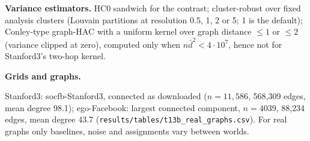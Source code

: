 \textbf{Variance estimators.} HC0 sandwich for the contrast; cluster-robust over fixed analysis clusters (Louvain partitions at resolution 0.5, 1, 2 or 5; 1 is the default); Conley-type graph-HAC with a uniform kernel over graph distance $\le1$ or $\le2$ (variance clipped at zero), computed only when $n\bar d^{2}<4\cdot10^{7}$, hence not for Stanford3's two-hop kernel.

\textbf{Grids and graphs.}
\begin{table}[h]
\caption{Grids: number of cells and replicates per cell (\texttt{results/tables/t13\_grid\_spec.csv}). $^\dagger$Designed after the first results were read (Appendix~\ref{app:post2}).}
\label{tab:grids}
\centering\scriptsize\setlength\tabcolsep{3pt}

\end{table}
\begin{table}[h]
\caption{Difference in means, OLS$(z,f)$ and the correctly specified regression by graph (concave spillover, $\gamma=2$, Bernoulli(0.5); \texttt{results/summary/e2.csv}).}
\label{tab:graphs}
\centering\scriptsize\setlength\tabcolsep{3pt}

\end{table}
Stanford3: socfb-Stanford3, connected as downloaded ($n=11{,}586$, 568{,}309 edges, mean degree 98.1); ego-Facebook: largest connected component, $n=4039$, 88{,}234 edges, mean degree 43.7 (\texttt{results/tables/t13b\_real\_graphs.csv}). For real graphs only baselines, noise and assignments vary between worlds.

\begin{table}[h]
\caption{Closed form (\ref{eq:bias}) versus simulation, 144 noiseless cells; \texttt{results/summary/theory\_vs\_sim\_e9.csv}.}
\label{tab:theory}
\centering\scriptsize\setlength\tabcolsep{3pt}

\end{table}
\begin{table}[h]
\caption{Log--log fits of the SD on $n$ and mean degree $d$ (ER graphs, Bernoulli(0.5)); \texttt{results/summary/e3.csv}.}
\label{tab:scaling}
\centering\scriptsize\setlength\tabcolsep{3pt}

\end{table}

